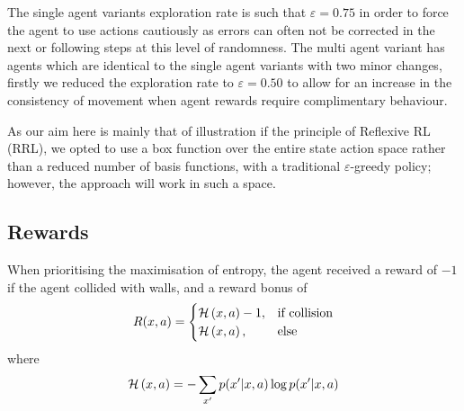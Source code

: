 \documentclass{article}
\begin{document}
The single agent variants exploration rate is such that $\varepsilon=0.75$ in order to force the agent to use actions cautiously as errors can often not be corrected in the next or following steps at this level of randomness. The multi agent variant has agents which are identical to the single agent variants with two minor changes, firstly we reduced the exploration rate to $\varepsilon=0.50$ to allow for an increase in the consistency of movement when agent rewards require complimentary behaviour. 

As our aim here is mainly that of illustration if the principle of Reflexive RL (RRL), we opted to use a box function over the entire state action space rather than a reduced number of basis functions, with a traditional $\varepsilon$-greedy policy; however, the approach will work in such a space.

\subsection{Rewards}

When prioritising the maximisation of entropy, the agent received a reward of $-1$ if the agent collided with walls, and a reward bonus of 
\begin{equation}
R(x,a)=
\begin{cases}
{\cal H}\left(x,a\right)-1 ,& $if collision$ \\
{\cal H}\left(x,a\right),& $else$
\end{cases}
	\label{reward}
\end{equation}
where
\begin{equation}
{\cal H}\left(x,a\right) = -\sum_{x'} p(x'|x,a) \log p(x'|x,a)
\end{equation}

\end{document}
